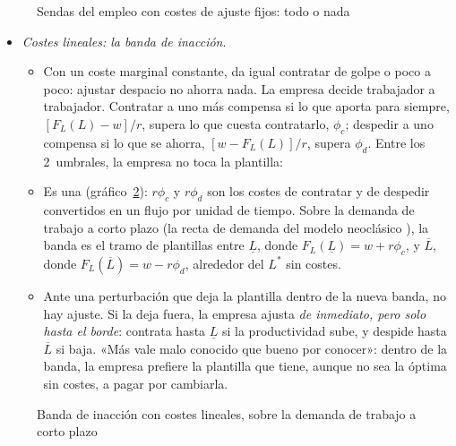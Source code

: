 \documentclass[11pt]{article}
\begin{document}
\begin{figure}[H]
\centering
\caption{Sendas del empleo con costes de ajuste fijos: todo o nada}\label{fig:sendas-fijos}
\end{figure}

\begin{itemize}
\item \emph{Costes lineales: la banda de inacción}.
  \begin{itemize}
  \item Con un coste marginal constante, da igual contratar de golpe o poco a poco: ajustar despacio no ahorra nada. La empresa decide trabajador a trabajador. Contratar a uno más compensa si lo que aporta para siempre, $[F_L(L)-w]/r$, supera lo que cuesta contratarlo, $\phi_c$; despedir a uno compensa si lo que se ahorra, $[w-F_L(L)]/r$, supera $\phi_d$\nocite{BentolilaBertola1990Firing}. Entre los 2~umbrales, la empresa no toca la plantilla:
  \item Es una  (gráfico~\ref{fig:banda-inaccion}): $r\phi_c$ y $r\phi_d$ son los costes de contratar y de despedir convertidos en un flujo por unidad de tiempo. Sobre la demanda de trabajo a corto plazo (la recta de demanda del modelo neoclásico ), la banda es el tramo de plantillas entre $\underline{L}$, donde $F_L(\underline{L})=w+r\phi_c$, y $\overline{L}$, donde $F_L(\overline{L})=w-r\phi_d$, alrededor del $L^*$ sin costes.
  \item Ante una perturbación que deja la plantilla dentro de la nueva banda, no hay ajuste. Si la deja fuera, la empresa ajusta \emph{de inmediato, pero solo hasta el borde}: contrata hasta $\underline{L}$ si la productividad sube, y despide hasta $\overline{L}$ si baja. «Más vale malo conocido que bueno por conocer»: dentro de la banda, la empresa prefiere la plantilla que tiene, aunque no sea la óptima sin costes, a pagar por cambiarla.
  \end{itemize}
\end{itemize}

\begin{figure}[H]
\centering
\caption{Banda de inacción con costes lineales, sobre la demanda de trabajo a corto plazo}\label{fig:banda-inaccion}
\end{figure}
\end{document}
